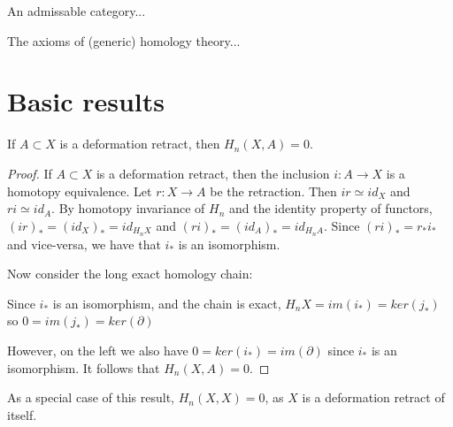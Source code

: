 An admissable category...

The axioms of (generic) homology theory...

\section{Basic results}
\begin{prop}
If $A\subset X$ is a deformation retract, then $H_n(X,A)=0$.
\end{prop}
\begin{proof}
If $A\subset X$ is a deformation retract, then the inclusion $i:A\rightarrow X$ is a homotopy equivalence. Let $r:X\rightarrow A$ be the retraction. Then $ir\simeq id_X$ and $ri\simeq id_A$.
By homotopy invariance of $H_n$ and the identity property of functors, $(ir)_*=(id_{X})_*=id_{H_nX}$ and $(ri)_*=(id_{A})_*=id_{H_nA}$. Since $(ri)_*=r_*i_*$ and vice-versa, we have that $i_*$ is an isomorphism.

Now consider the long exact homology chain:



Since $i_*$ is an isomorphism, and the chain is exact, $H_nX=im(i_*)=ker(j_*)$ so $0=im(j_*)=ker(\partial)$

However, on the left we also have $0=ker(i_*)=im(\partial)$ since $i_*$ is an isomorphism. It follows that $H_n(X,A)=0$.

\end{proof}

\begin{remark}
As a special case of this result, $H_n(X,X)=0$, as $X$ is a deformation retract of itself.
\end{remark}

